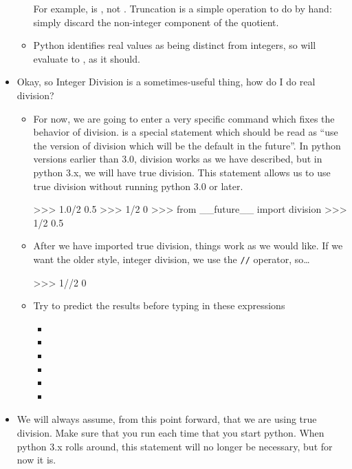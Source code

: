 \begin{itemize}
\begin{itemize}
            For example,  is , not .
            Truncation is a simple operation to do by hand: simply discard the non-integer component of the quotient.
        \item Python identifies real values as being distinct from integers, so  will evaluate to , as it should.
    \end{itemize}
    \item Okay, so Integer Division is a sometimes-useful thing, how do I do real division?
    \begin{itemize}
        \item For now, we are going to enter a very specific command which fixes the behavior of division.
             is a special statement which should be read as ``use the version of division which will be the default in the future''.
            In python versions earlier than 3.0, division works as we have described, but in python 3.x, we will have true division.
            This statement allows us to use true division without running python 3.0 or later.
\begin{codeblock}
>>> 1.0/2
0.5
>>> 1/2
0
>>> from __future__ import division
>>> 1/2
0.5
\end{codeblock}
        \item After we have imported true division, things work as we would like.
            If we want the older style, integer division, we use the \texttt{//} operator, so\ldots
\begin{codeblock}
>>> 1//2
0
\end{codeblock}
        \item Try to predict the results before typing in these expressions
        \begin{itemize}
            \item {}
            \item {}
            \item {}
            \item {}
            \item {}
            \item {}
        \end{itemize}
    \end{itemize}
    \item We will always assume, from this point forward, that we are using true division.
        Make sure that you run  each time that you start python.
        When python 3.x rolls around, this statement will no longer be necessary, but for now it is.
\end{itemize}

